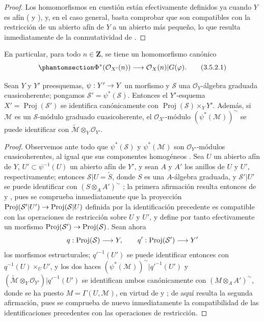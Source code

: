 \documentclass[oneside,10pt]{amsart}
\makeatletter
\newcommand{\ega@arrow}[2]{\mathchoice{#1}{#2}{#2}{#2}}
\renewcommand{\to}{\ega@arrow{\longrightarrow}{\rightarrow}}
\let\EGAOriginalLabel\label
\renewcommand{\label}[1]{\phantomsection\EGAOriginalLabel{#1}}
\makeatother
\begin{document}
\begin{proof}
Los homomorfismos en cuestión están efectivamente definidos ya cuando $Y$ es afín ( y ), y, en el caso general, basta comprobar que son compatibles con la restricción de un abierto afín de $Y$ a un abierto más pequeño, lo que resulta inmediatamente de la conmutatividad de .
\end{proof}

En particular, para todo $n\in\mathbf{Z}$, se tiene un homomorfismo canónico
\[
\label{II.3.5.2.1-fr}
  \Phi^*(\mathcal{O}_{X'}(n))\longrightarrow
  \mathcal{O}_X(n)|G(\varphi).
\tag{3.5.2.1}
\]

\begin{proposition}[3.5.3]
\label{II.3.5.3-fr}
Sean $Y$ y $Y'$ preesquemas, $\psi:Y'\to Y$ un morfismo y $\mathcal{S}$ una $\mathcal{O}_Y$-álgebra graduada cuasicoherente; pongamos $\mathcal{S}'=\psi^*(\mathcal{S})$.
Entonces el $Y'$-esquema $X'=\operatorname{Proj}(\mathcal{S}')$ se identifica canónicamente con $\operatorname{Proj}(\mathcal{S})\times_Y Y'$.
Además, si $\mathcal{M}$ es un $\mathcal{S}$-módulo graduado cuasicoherente, el $\mathcal{O}_{X'}$-módulo $(\psi^*(\mathcal{M}))^{\sim}$ se puede identificar con $\widetilde{\mathcal{M}}\otimes_Y\mathcal{O}_{Y'}$.
\end{proposition}

\begin{proof}
Observemos ante todo que $\psi^*(\mathcal{S})$ y $\psi^*(\mathcal{M})$ son $\mathcal{O}_{Y'}$-módulos cuasicoherentes, al igual que sus componentes homogéneos .
Sea $U$ un abierto afín de $Y$, $U'\subset\psi^{-1}(U)$ un abierto afín de $Y'$, y sean $A$ y $A'$ los anillos de $U$ y $U'$, respectivamente; entonces $\mathcal{S}|U=\widetilde{S}$, donde $S$ es una $A$-álgebra graduada, y $\mathcal{S}'|U'$ se puede identificar con $(S\otimes_A A')^{\sim}$ ; la primera afirmación resulta entonces de  y , pues se comprueba inmediatamente que la proyección $\operatorname{Proj}(\mathcal{S}'|U')\to
\operatorname{Proj}(\mathcal{S}|U)$ definida por la identificación precedente es compatible con las operaciones de restricción sobre $U$ y $U'$, y define por tanto efectivamente un morfismo $\operatorname{Proj}(\mathcal{S}')\to\operatorname{Proj}(\mathcal{S})$.
Sean ahora
\[
  q:\operatorname{Proj}(\mathcal{S})\to Y,
  \qquad q':\operatorname{Proj}(\mathcal{S}')\to Y'
\]
los morfismos estructurales; $q'^{-1}(U')$ se puede identificar entonces con $q^{-1}(U)\times_U U'$, y los dos haces $(\psi^*(\mathcal{M}))^{\sim}|q'^{-1}(U')$ y $(\widetilde{\mathcal{M}}\otimes_Y\mathcal{O}_{Y'})|q'^{-1}(U')$ se identifican ambos canónicamente con $(M\otimes_A A')^{\sim}$, donde se ha puesto $M=\Gamma(U,\mathcal{M})$, en virtud de  y ; de aquí resulta la segunda afirmación, pues se comprueba de nuevo inmediatamente la compatibilidad de las identificaciones precedentes con las operaciones de restricción.
\end{proof}
\end{document}

